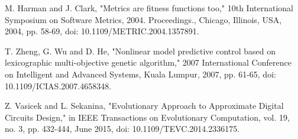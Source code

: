\documentclass[conference]{IEEEtran}
\begin{document}
\begin{thebibliography}{00}
 M. Harman and J. Clark, "Metrics are fitness functions too," 10th International Symposium on Software Metrics, 2004. Proceedings., Chicago, Illinois, USA, 2004, pp. 58-69, doi: 10.1109/METRIC.2004.1357891.

 T. Zheng, G. Wu and D. He, "Nonlinear model predictive control based on lexicographic multi-objective genetic algorithm," 2007 International Conference on Intelligent and Advanced Systems, Kuala Lumpur, 2007, pp. 61-65, doi: 10.1109/ICIAS.2007.4658348.

Z. Vasicek and L. Sekanina, "Evolutionary Approach to Approximate Digital Circuits Design," in IEEE Transactions on Evolutionary Computation, vol. 19, no. 3, pp. 432-444, June 2015, doi: 10.1109/TEVC.2014.2336175.
\end{thebibliography}
\end{document}
